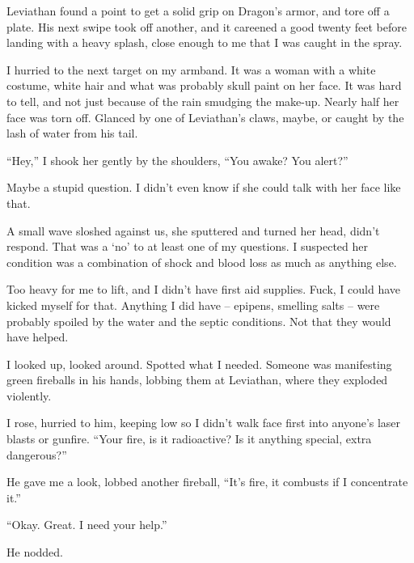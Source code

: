 Leviathan found a point to get a solid grip on Dragon's armor, and tore off a plate.  His next swipe took off another, and it careened a good twenty feet before landing with a heavy splash, close enough to me that I was caught in the spray.



I hurried to the next target on my armband.  It was a woman with a white costume, white hair and what was probably skull paint on her face.  It was hard to tell, and not just because of the rain smudging the make-up.  Nearly half her face was torn off.  Glanced by one of Leviathan's claws, maybe, or caught by the lash of water from his tail.



``Hey,'' I shook her gently by the shoulders, ``You awake?  You alert?''



Maybe a stupid question.  I didn't even know if she could talk with her face like that.



A small wave sloshed against us, she sputtered and turned her head, didn't respond.  That was a `no' to at least one of my questions.  I suspected her condition was a combination of shock and blood loss as much as anything else.



Too heavy for me to lift, and I didn't have first aid supplies.  Fuck, I could have kicked myself for that.  Anything I did have – epipens, smelling salts – were probably spoiled by the water and the septic conditions.  Not that they would have helped.



I looked up, looked around.  Spotted what I needed.  Someone was manifesting green fireballs in his hands, lobbing them at Leviathan, where they exploded violently.



I rose, hurried to him, keeping low so I didn't walk face first into anyone's laser blasts or gunfire.  ``Your fire, is it radioactive? Is it anything special, extra dangerous?''



He gave me a look, lobbed another fireball, ``It's fire, it combusts if I concentrate it.''



``Okay.  Great.  I need your help.''



He nodded.




